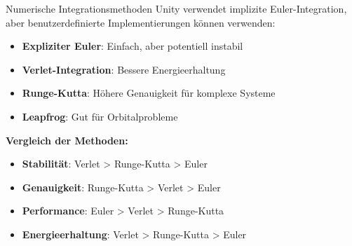 \begin{concept}{Numerische Integrationsmethoden}
    Unity verwendet implizite Euler-Integration, aber benutzerdefinierte Implementierungen können verwenden:
    \begin{itemize}
        \item \textbf{Expliziter Euler}: Einfach, aber potentiell instabil
        \item \textbf{Verlet-Integration}: Bessere Energieerhaltung
        \item \textbf{Runge-Kutta}: Höhere Genauigkeit für komplexe Systeme
        \item \textbf{Leapfrog}: Gut für Orbitalprobleme
    \end{itemize}
    
    \textbf{Vergleich der Methoden:}
    \begin{itemize}
        \item \textbf{Stabilität}: Verlet > Runge-Kutta > Euler
        \item \textbf{Genauigkeit}: Runge-Kutta > Verlet > Euler
        \item \textbf{Performance}: Euler > Verlet > Runge-Kutta
        \item \textbf{Energieerhaltung}: Verlet > Runge-Kutta > Euler
    \end{itemize}
\end{concept}

